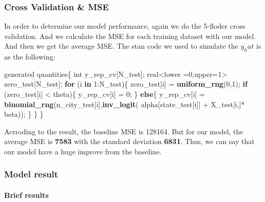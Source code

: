 \documentclass[]{tufte-handout}
\newenvironment{Shaded}{}{}
\newcommand{\ControlFlowTok}[1]{\textcolor[rgb]{0.00,0.44,0.13}{\textbf{#1}}}
\newcommand{\DecValTok}[1]{\textcolor[rgb]{0.25,0.63,0.44}{#1}}
\newcommand{\KeywordTok}[1]{\textcolor[rgb]{0.00,0.44,0.13}{\textbf{#1}}}
\newcommand{\NormalTok}[1]{#1}
\newcommand{\OperatorTok}[1]{\textcolor[rgb]{0.40,0.40,0.40}{#1}}
\newcommand{\StringTok}[1]{\textcolor[rgb]{0.25,0.44,0.63}{#1}}
\begin{document}
\hypertarget{cross-validation-mse}{%
\subsubsection{Cross Validation \& MSE}\label{cross-validation-mse}}

In order to determine our model performance, again we do the 5-floder
cross validation. And we calculate the MSE for each training dataset
with our model. And then we get the average MSE. The stan code we used
to simulate the \(y_hat\) is as the following:

\begin{Shaded}
\begin{Highlighting}[]
\NormalTok{generated quantities\{}
\NormalTok{  int y_rep_cv[N_test];}
\NormalTok{  real}\OperatorTok{<}\NormalTok{lower =}\DecValTok{0}\NormalTok{,upper=}\DecValTok{1}\OperatorTok{>}\StringTok{ }\NormalTok{zero_test[N_test];}
  \ControlFlowTok{for}\NormalTok{ (i }\ControlFlowTok{in} \DecValTok{1}\OperatorTok{:}\NormalTok{N_test)\{}
\NormalTok{    zero_test[i] =}\StringTok{ }\KeywordTok{uniform_rng}\NormalTok{(}\DecValTok{0}\NormalTok{,}\DecValTok{1}\NormalTok{);}
    \ControlFlowTok{if}\NormalTok{ (zero_test[i] }\OperatorTok{<}\StringTok{ }\NormalTok{theta)\{}
\NormalTok{      y_rep_cv[i] =}\StringTok{ }\DecValTok{0}\NormalTok{;}
\NormalTok{      \}}
    \ControlFlowTok{else}\NormalTok{\{}
\NormalTok{      y_rep_cv[i] =}\StringTok{ }\KeywordTok{binomial_rng}\NormalTok{(n_city_test[i],}\KeywordTok{inv_logit}\NormalTok{( alpha[state_test[i]] }\OperatorTok{+}\StringTok{ }\NormalTok{X_test[i,]}\OperatorTok{*}\StringTok{ }\NormalTok{beta));}
\NormalTok{      \}}
\NormalTok{  \}}
\NormalTok{\}}
\end{Highlighting}
\end{Shaded}

Acrroding to the result, the baseline MSE is 128164. But for our model,
the average MSE is \textbf{7583} with the standard deviation
\textbf{6831}. Thus, we can say that our model have a huge improve from
the baseline.

\hypertarget{model-result}{%
\subsubsection{Model result}\label{model-result}}

\hypertarget{brief-results}{%
\paragraph{Brief results}\label{brief-results}}
\end{document}
